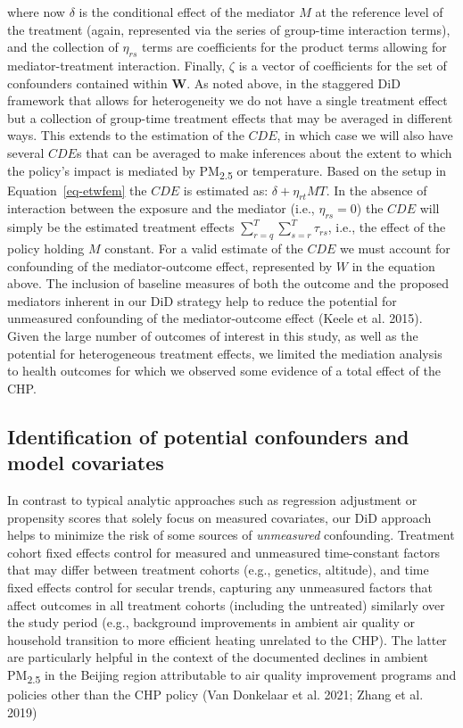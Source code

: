 \documentclass[
  letterpaper,
  DIV=11,
  numbers=noendperiod]{scrartcl}
\begin{document}
where now \(\delta\) is the conditional effect of the mediator \(M\) at
the reference level of the treatment (again, represented via the series
of group-time interaction terms), and the collection of \(\eta_{rs}\)
terms are coefficients for the product terms allowing for
mediator-treatment interaction. Finally, \(\zeta\) is a vector of
coefficients for the set of confounders contained within \(\mathbf{W}\).
As noted above, in the staggered DiD framework that allows for
heterogeneity we do not have a single treatment effect but a collection
of group-time treatment effects that may be averaged in different ways.
This extends to the estimation of the \(CDE\), in which case we will
also have several \(CDE\)s that can be averaged to make inferences about
the extent to which the policy's impact is mediated by
PM\textsubscript{2.5} or temperature. Based on the setup in
Equation~\ref{eq-etwfem} the \(CDE\) is estimated as:
\(\delta + \eta_{rt}MT\). In the absence of interaction between the
exposure and the mediator (i.e., \(\eta_{rs}=0\)) the \(CDE\) will
simply be the estimated treatment effects
\(\sum_{r=q}^{T} \sum_{s=r}^{T} \tau_{rs}\), i.e., the effect of the
policy holding \(M\) constant. For a valid estimate of the \(CDE\) we
must account for confounding of the mediator-outcome effect, represented
by \(W\) in the equation above. The inclusion of baseline measures of
both the outcome and the proposed mediators inherent in our DiD strategy
help to reduce the potential for unmeasured confounding of the
mediator-outcome effect (Keele et al. 2015). Given the large number of
outcomes of interest in this study, as well as the potential for
heterogeneous treatment effects, we limited the mediation analysis to
health outcomes for which we observed some evidence of a total effect of
the CHP.

\subsection{Identification of potential confounders and model
covariates}\label{identification-of-potential-confounders-and-model-covariates}

In contrast to typical analytic approaches such as regression adjustment
or propensity scores that solely focus on measured covariates, our DiD
approach helps to minimize the risk of some sources of \emph{unmeasured}
confounding. Treatment cohort fixed effects control for measured and
unmeasured time-constant factors that may differ between treatment
cohorts (e.g., genetics, altitude), and time fixed effects control for
secular trends, capturing any unmeasured factors that affect outcomes in
all treatment cohorts (including the untreated) similarly over the study
period (e.g., background improvements in ambient air quality or
household transition to more efficient heating unrelated to the CHP).
The latter are particularly helpful in the context of the documented
declines in ambient PM\textsubscript{2.5} in the Beijing region
attributable to air quality improvement programs and policies other than
the CHP policy (Van Donkelaar et al. 2021; Zhang et al. 2019)
\end{document}
